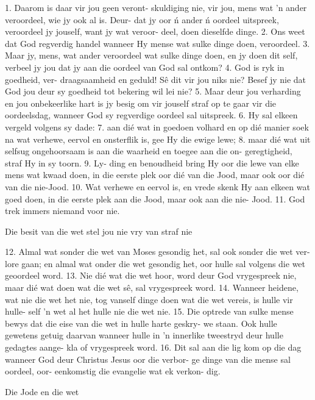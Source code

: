 1.  Daarom is daar vir jou geen veront-
skuldiging nie, vir jou, mens wat 'n 
ander veroordeel, wie jy ook al is.  Deur-
dat jy oor \'n ander \'n oordeel uitspreek, 
veroordeel jy jouself, want jy wat veroor-
deel, doen dieselfde dinge.  2.  Ons weet dat
God regverdig handel wanneer Hy mense
wat sulke dinge doen, veroordeel.  3.  Maar
jy, mens, wat ander veroordeel wat sulke 
dinge doen, en jy doen dit self, verbeel jy 
jou dat jy aan die oordeel van God sal 
ontkom?  4.  God is ryk in goedheid, ver-
draagsaamheid en geduld!  Sê dit vir jou 
niks nie?  Besef jy nie dat God jou deur sy 
goedheid tot bekering wil lei nie?  5.  Maar
deur jou verharding en jou onbekeerlike 
hart is jy besig om vir jouself straf op te 
gaar vir die oordeelsdag, wanneer God 
sy regverdige oordeel sal uitspreek.  6.  Hy 
sal elkeen vergeld volgens sy dade:  7.  aan
dié wat in goedoen volhard en op dié 
manier soek na wat verhewe, eervol en 
onsterflik is, gee Hy die ewige lewe;
8.  maar dié wat uit selfsug ongehoorsaam
is aan die waarheid en toegee aan die on-
geregtigheid, straf Hy in sy toorn.  9.  Ly-
ding en benoudheid bring Hy oor die 
lewe van elke mens wat kwaad doen, in 
die eerste plek oor dié van die Jood, maar
ook oor dié van die nie-Jood.  10.  Wat 
verhewe en eervol is, en vrede skenk Hy 
aan elkeen wat goed doen, in die eerste
plek aan die Jood, maar ook aan die nie-
Jood.  11.  God trek immers niemand voor
nie.

Die besit van die wet stel jou nie vry van
straf nie

12.  Almal wat sonder die wet van Moses
gesondig het, sal ook sonder die wet ver-
lore gaan;  en almal wat onder die wet
gesondig het, oor hulle sal volgens die
wet geoordeel word.  13.  Nie dié wat die
wet hoor, word deur God vrygespreek
nie, maar dié wat doen wat die wet sê, sal
vrygespreek word.  14.  Wanneer heidene,
wat nie die wet het nie, tog vanself dinge
doen wat die wet vereis, is hulle vir hulle-
self 'n wet al het hulle nie die wet nie.
15.  Die optrede van sulke mense bewys dat
die eise van die wet in hulle harte geskry-
we staan.  Ook hulle gewetens getuig 
daarvan wanneer hulle in 'n innerlike 
tweestryd deur hulle gedagtes aange-
kla of vrygespreek word.  16.  Dit sal aan 
die lig kom op die dag wanneer God 
deur Christus Jesus oor die verbor-
ge dinge van die mense sal oordeel, oor-
eenkomstig die evangelie wat ek verkon-
dig.

Die Jode en die wet

